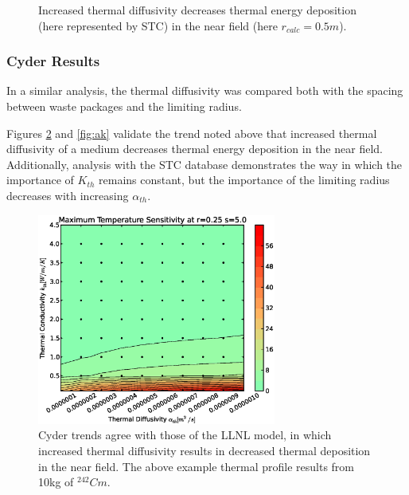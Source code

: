 \begin{figure}[htbp!]
\begin{center}
\end{center}
\caption[$K_{th}$ Sensitivity for High $\alpha_{th}$]{Increased thermal diffusivity decreases thermal energy deposition 
(here represented by \gls{STC}) in the near field (here $r_{calc} = 0.5m$).}
\label{fig:Cm242alpha_kth_high}
\end{figure}


\FloatBarrier
\subsubsection{Cyder Results}

In a similar analysis, the thermal diffusivity was compared both with the 
spacing between waste packages and the limiting radius. 

Figures \ref{fig:ar} and \ref{fig:ak} validate the trend noted above that 
increased thermal diffusivity of a medium decreases thermal energy deposition 
in the near field.  Additionally, analysis with the \Cyder STC database 
demonstrates the way in which the importance of $K_{th}$ remains constant, but 
the importance of the limiting radius decreases with increasing $\alpha_{th}$.

\begin{figure}[htbp!]
\begin{center}
\includegraphics[width=0.7\textwidth]{./chapters/demonstration/diffusivity/ak.eps}
\end{center}
\caption[$\alpha_{th}$ vs. $K_{th}$ Sensitivity in Cyder]{Cyder trends agree
with those of the LLNL model, in which increased thermal diffusivity results in 
decreased thermal deposition in the near field. The above example thermal 
profile results from 10kg of $^{242}Cm$.} 
\label{fig:ar}
\end{figure}



